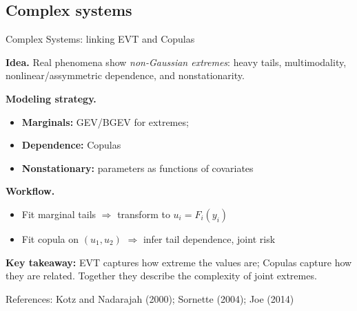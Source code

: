 \subsection{Complex systems}
\begin{frame}{Complex Systems: linking EVT and Copulas}
\small

\textbf{Idea.}  
Real phenomena show \textit{non-Gaussian extremes}: heavy tails, multimodality, nonlinear/assymmetric dependence, and nonstationarity.

\vspace{0.3cm}
\textbf{Modeling strategy.}
\begin{itemize}
  \item \textbf{Marginals:} GEV/BGEV for extremes;
  \item \textbf{Dependence:} Copulas
  \item \textbf{Nonstationary:} parameters as functions of covariates
\end{itemize}

\vspace{0.25cm}
\textbf{Workflow.}
\begin{itemize}
  \item Fit marginal tails $\Rightarrow$ transform to $u_i = F_i(y_i)$
  \item Fit copula on $(u_1,u_2)$ $\Rightarrow$ infer tail dependence, joint risk
\end{itemize}

\vspace{0.25cm}
\textbf{Key takeaway:}  
EVT captures how extreme the values are; Copulas capture how they are related. Together they describe the complexity of joint extremes.

\vfill
\begin{flushright}
{\tiny References: Kotz and Nadarajah (2000); Sornette (2004); Joe (2014)}
\end{flushright}

\end{frame}

